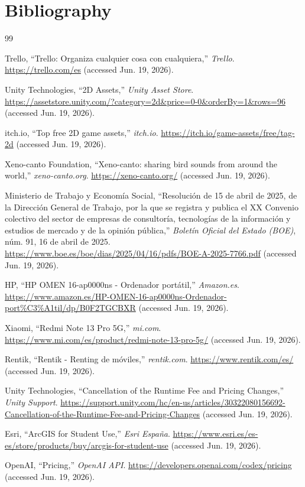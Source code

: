 \chapter*{Bibliography}

\begin{thebibliography}{99}

Trello, ``Trello: Organiza cualquier cosa con cualquiera,'' \textit{Trello}. \url{https://trello.com/es} (accessed Jun. 19, 2026).

Unity Technologies, ``2D Assets,'' \textit{Unity Asset Store}. \url{https://assetstore.unity.com/?category=2d&price=0-0&orderBy=1&rows=96} (accessed Jun. 19, 2026).

itch.io, ``Top free 2D game assets,'' \textit{itch.io}. \url{https://itch.io/game-assets/free/tag-2d} (accessed Jun. 19, 2026).

Xeno-canto Foundation, ``Xeno-canto: sharing bird sounds from around the world,'' \textit{xeno-canto.org}. \url{https://xeno-canto.org/} (accessed Jun. 19, 2026).

Ministerio de Trabajo y Economía Social, ``Resolución de 15 de abril de 2025, de la Dirección General de Trabajo, por la que se registra y publica el XX Convenio colectivo del sector de empresas de consultoría, tecnologías de la información y estudios de mercado y de la opinión pública,'' \textit{Boletín Oficial del Estado (BOE)}, núm. 91, 16 de abril de 2025. \url{https://www.boe.es/boe/dias/2025/04/16/pdfs/BOE-A-2025-7766.pdf} (accessed Jun. 19, 2026).

HP, ``HP OMEN 16-ap0000ns - Ordenador portátil,'' \textit{Amazon.es}. \url{https://www.amazon.es/HP-OMEN-16-ap0000ns-Ordenador-port\%C3\%A1til/dp/B0F2TGCBXR} (accessed Jun. 19, 2026).

Xiaomi, ``Redmi Note 13 Pro 5G,'' \textit{mi.com}. \url{https://www.mi.com/es/product/redmi-note-13-pro-5g/} (accessed Jun. 19, 2026).

Rentik, ``Rentik - Renting de móviles,'' \textit{rentik.com}. \url{https://www.rentik.com/es/} (accessed Jun. 19, 2026).

Unity Technologies, ``Cancellation of the Runtime Fee and Pricing Changes,'' \textit{Unity Support}. \url{https://support.unity.com/hc/en-us/articles/30322080156692-Cancellation-of-the-Runtime-Fee-and-Pricing-Changes} (accessed Jun. 19, 2026).

Esri, ``ArcGIS for Student Use,'' \textit{Esri España}. \url{https://www.esri.es/es-es/store/products/buy/arcgis-for-student-use} (accessed Jun. 19, 2026).

OpenAI, ``Pricing,'' \textit{OpenAI API}. \url{https://developers.openai.com/codex/pricing} (accessed Jun. 19, 2026).

\end{thebibliography}

